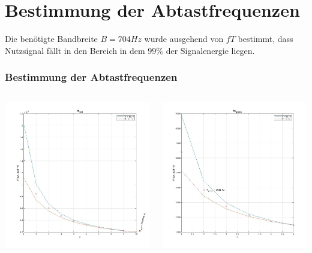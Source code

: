 \documentclass{beamer}
\begin{document}
\section{Bestimmung der Abtastfrequenzen}
\begin{frame}
  Die benötigte Bandbreite $B = 704Hz$ wurde ausgehend von $fT$ bestimmt, dass Nutzsignal fällt in den Bereich
  in dem $99\%$ der Signalenergie liegen.
  \frametitle{Bestimmung der Abtastfrequenzen}
  \begin{columns}
    \begin{column}{0.5\textwidth}
      \includegraphics[width=\textwidth, height=0.7\textheight]{images/fAred.jpg}
    \end{column}
    \begin{column}{0.5\textwidth}
      \includegraphics[width=\textwidth, height=0.7\textheight]{images/fAgreen.jpg}

\end{column}
\end{columns}
\end{frame}
\end{document}
